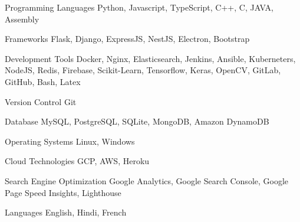 

\begin{cvskills}

  \cvskill
    {Programming Languages} %
    {Python, Javascript, TypeScript, C++, C, JAVA, Assembly} %
    
  \cvskill
    {Frameworks} %
    {Flask, Django, ExpressJS, NestJS, Electron, Bootstrap} %

  \cvskill
    {Development Tools} %
    {Docker, Nginx, Elasticsearch, Jenkins, Ansible, Kuberneters, NodeJS, Redis, Firebase, Scikit-Learn, Tensorflow, Keras, OpenCV, GitLab, GitHub, Bash, Latex} %
    
  \cvskill
    {Version Control} %
    {Git} %
    
  \cvskill
    {Database} %
    {MySQL, PostgreSQL, SQLite, MongoDB, Amazon DynamoDB} %

  \cvskill
    {Operating Systems} %
    {Linux, Windows} %

  \cvskill
    {Cloud Technologies} %
    {GCP, AWS, Heroku} %

  \cvskill
    {Search Engine Optimization} %
    {Google Analytics, Google Search Console, Google Page Speed Insights, Lighthouse} %
    
  \cvskill
    {Languages} %
    {English, Hindi, French} %

\end{cvskills}
